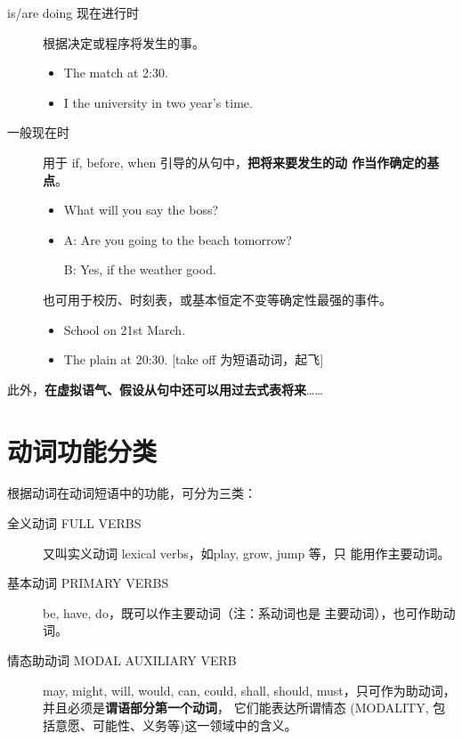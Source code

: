 \begin{description}
\item[is/are doing 现在进行时] 根据决定或程序将发生的事。
  \begin{itemize}
  \item The match  at 2:30.

  \item I the university in two year's time.
  \end{itemize}
\item[一般现在时] 用于 if, before, when 引导的从句中，\textbf{把将来要发生的动
    作当作确定的基点}。
  \begin{itemize}
  \item What will you say  the boss?

  \item A: Are you going to the beach tomorrow?

    B: Yes, if the weather  good.
  \end{itemize}

  也可用于校历、时刻表，或基本恒定不变等确定性最强的事件。
  \begin{itemize}
  \item School  on 21st March.

  \item The plain  at 20:30. [take off 为短语动词，起飞]

  \end{itemize}
\end{description}

此外，\textbf{在虚拟语气、假设从句中还可以用过去式表将来}……


\section{动词功能分类}

根据动词在动词短语中的功能，可分为三类：
\begin{description}
\item[全义动词 FULL VERBS] 又叫实义动词 lexical verbs，如play, grow, jump 等，只
  能用作主要动词。
\item[基本动词 PRIMARY VERBS] be, have, do，既可以作主要动词（注：系动词也是
  主要动词），也可作助动词。
\item[情态助动词 MODAL AUXILIARY VERB] may, might, will, would, can, could,
  shall, should, must，只可作为助动词，并且必须是\textbf{谓语部分第一个动词}，
  它们能表达所谓情态 (MODALITY, 包括意愿、可能性、义务等)这一领域中的含义。

\end{description}


